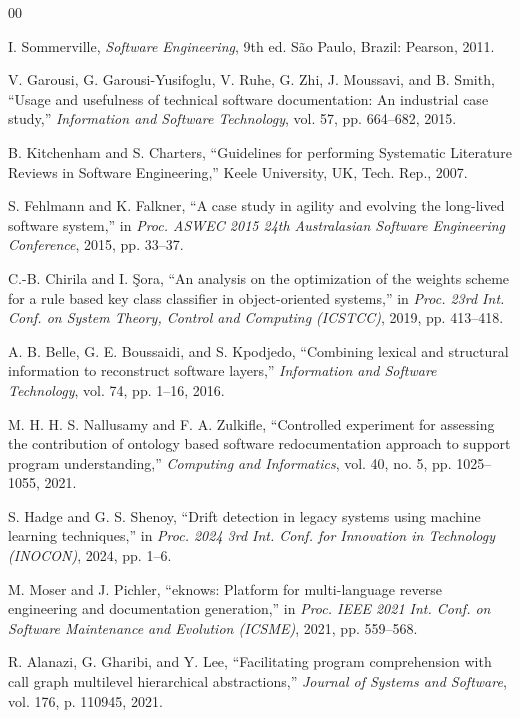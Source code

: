 \documentclass{ieeeaccess}
\begin{document}
\begin{thebibliography}{00}

 I. Sommerville, \emph{Software Engineering}, 9th ed. São Paulo, Brazil: Pearson, 2011.

 V. Garousi, G. Garousi-Yusifoglu, V. Ruhe, G. Zhi, J. Moussavi, and B. Smith, ``Usage and usefulness of technical software documentation: An industrial case study,'' \emph{Information and Software Technology}, vol. 57, pp. 664--682, 2015.

 B. Kitchenham and S. Charters, ``Guidelines for performing Systematic Literature Reviews in Software Engineering,'' Keele University, UK, Tech. Rep., 2007.

 S. Fehlmann and K. Falkner, ``A case study in agility and evolving the long-lived software system,'' in \emph{Proc. ASWEC 2015 24th Australasian Software Engineering Conference}, 2015, pp. 33--37.

 C.-B. Chirila and I. Şora, ``An analysis on the optimization of the weights scheme for a rule based key class classifier in object-oriented systems,'' in \emph{Proc. 23rd Int. Conf. on System Theory, Control and Computing (ICSTCC)}, 2019, pp. 413--418.

 A. B. Belle, G. E. Boussaidi, and S. Kpodjedo, ``Combining lexical and structural information to reconstruct software layers,'' \emph{Information and Software Technology}, vol. 74, pp. 1--16, 2016.

 M. H. H. S. Nallusamy and F. A. Zulkifle, ``Controlled experiment for assessing the contribution of ontology based software redocumentation approach to support program understanding,'' \emph{Computing and Informatics}, vol. 40, no. 5, pp. 1025--1055, 2021.

 S. Hadge and G. S. Shenoy, ``Drift detection in legacy systems using machine learning techniques,'' in \emph{Proc. 2024 3rd Int. Conf. for Innovation in Technology (INOCON)}, 2024, pp. 1--6.

 M. Moser and J. Pichler, ``eknows: Platform for multi-language reverse engineering and documentation generation,'' in \emph{Proc. IEEE 2021 Int. Conf. on Software Maintenance and Evolution (ICSME)}, 2021, pp. 559--568.

 R. Alanazi, G. Gharibi, and Y. Lee, ``Facilitating program comprehension with call graph multilevel hierarchical abstractions,'' \emph{Journal of Systems and Software}, vol. 176, p. 110945, 2021.


\end{thebibliography}
\end{document}
